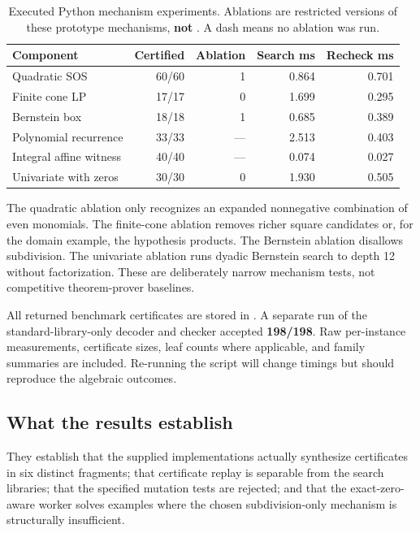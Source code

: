 \begin{table}[htbp]
\centering\small
\begin{tabular}{@{}lrrrr@{}}
\toprule
Component & Certified & Ablation & Search ms & Recheck ms \\
\midrule
Quadratic SOS & 60/60 & 1 & 0.864 & 0.701 \\
Finite cone LP & 17/17 & 0 & 1.699 & 0.295 \\
Bernstein box & 18/18 & 1 & 0.685 & 0.389 \\
Polynomial recurrence & 33/33 & --- & 2.513 & 0.403 \\
Integral affine witness & 40/40 & --- & 0.074 & 0.027 \\
Univariate with zeros & 30/30 & 0 & 1.930 & 0.505 \\
\bottomrule
\end{tabular}
\caption{Executed Python mechanism experiments. Ablations are restricted versions of these prototype mechanisms, \textbf{not \grind{}}. A dash means no ablation was run.}
\label{tab:results}
\end{table}

The quadratic ablation only recognizes an expanded nonnegative combination of even monomials. The finite-cone ablation removes richer square candidates or, for the domain example, the hypothesis products. The Bernstein ablation disallows subdivision. The univariate ablation runs dyadic Bernstein search to depth 12 without factorization. These are deliberately narrow mechanism tests, not competitive theorem-prover baselines.

All returned benchmark certificates are stored in . A separate run of the standard-library-only decoder and checker accepted \textbf{198/198}. Raw per-instance measurements, certificate sizes, leaf counts where applicable, and family summaries are included. Re-running the script will change timings but should reproduce the algebraic outcomes.

\subsection{What the results establish}

They establish that the supplied implementations actually synthesize certificates in six distinct fragments; that certificate replay is separable from the search libraries; that the specified mutation tests are rejected; and that the exact-zero-aware worker solves examples where the chosen subdivision-only mechanism is structurally insufficient.

